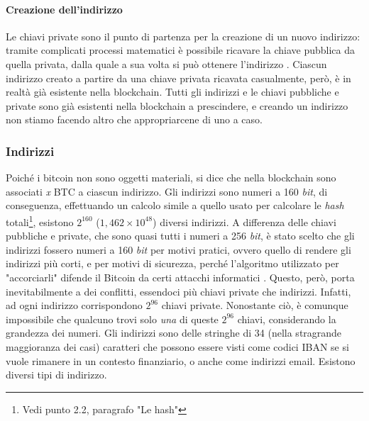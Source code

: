 \documentclass {article}
\begin{document}
\paragraph {Creazione dell'indirizzo}

Le chiavi private sono il punto di partenza per la creazione di un nuovo indirizzo: tramite complicati processi matematici è possibile ricavare la chiave pubblica da quella privata, dalla quale a sua volta si può ottenere l'indirizzo \cite{makingaddress}.
Ciascun indirizzo creato a partire da una chiave privata ricavata casualmente, però, è in realtà già esistente nella blockchain.
Tutti gli indirizzi e le chiavi pubbliche e private sono già esistenti nella blockchain a prescindere, e creando un indirizzo non stiamo facendo altro che appropriarcene di uno a caso.


\subsubsection {Indirizzi}


Poiché i bitcoin non sono oggetti materiali, si dice che nella blockchain sono associati \textit{x} BTC a ciascun indirizzo.
Gli indirizzi sono numeri a 160 \textit{bit}, di conseguenza, effettuando un calcolo simile a quello usato per calcolare le \textit{hash} totali\footnote{Vedi punto 2.2, paragrafo "Le hash"}, esistono $2^{160}$ ($1,462 \times 10^{48}$) diversi indirizzi.
A differenza delle chiavi pubbliche e private, che sono quasi tutti i numeri a 256 \textit{bit}, è stato scelto che gli indirizzi fossero numeri a 160 \textit{bit} per motivi pratici, ovvero quello di rendere gli indirizzi più corti, e per motivi di sicurezza, perché l'algoritmo utilizzato per "accorciarli" difende il Bitcoin da certi attacchi informatici \cite{160address}.
Questo, però, porta inevitabilmente a dei conflitti, essendoci più chiavi private che indirizzi.
Infatti, ad ogni indirizzo corrispondono $2^{96}$ chiavi private.
Nonostante ciò, è comunque impossibile che qualcuno trovi solo \emph{una} di queste $2^{96}$ chiavi, considerando la grandezza dei numeri.
Gli indirizzi sono delle stringhe di 34 (nella stragrande maggioranza dei casi) caratteri che possono essere visti come codici IBAN se si vuole rimanere in un contesto finanziario, o anche come indirizzi email.
Esistono diversi tipi di indirizzo.
\end{document}
